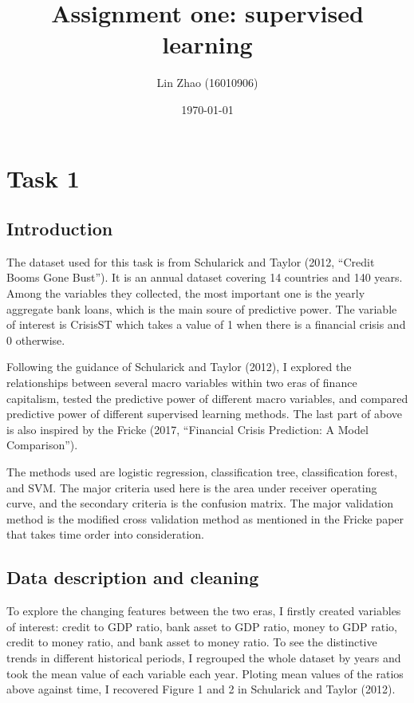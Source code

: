\documentclass{article}
\begin{document}
\title{Assignment one: supervised learning}
\author{Lin Zhao (16010906)}
\date{\today}
\maketitle

\newpage

\section*{Task 1}

\subsection*{Introduction}

The dataset used for this task is from Schularick and Taylor (2012,
``Credit Booms Gone Bust''). It is an annual dataset covering 14
countries and 140 years. Among the variables they collected, the most
important one is the yearly aggregate bank loans, which is 
the main soure of predictive power. The variable of interest is
CrisisST which takes a value of 1 when there is a financial crisis and 0
otherwise.

Following the guidance of Schularick and Taylor (2012), I explored the
relationships between several macro variables within two
eras of finance capitalism, tested the predictive power of different
macro variables, and compared predictive power of different supervised
learning methods. The last part of above is also inspired by the
Fricke (2017, ``Financial Crisis Prediction: A Model Comparison''). 

The methods used are logistic regression, classification
tree, classification forest, and SVM. The major criteria
used here is the area under receiver operating curve, and the secondary criteria
is the confusion matrix. The major validation method is the modified cross
validation method  as mentioned in the Fricke paper that takes time order into
consideration.

\subsection*{Data description and cleaning}

To explore the changing features between the two eras, I firstly created
variables of interest: credit to GDP ratio, bank asset to GDP ratio,
money to GDP ratio, credit to money ratio, and bank asset to money
ratio. To see the distinctive trends in different historical periods, I
regrouped the whole dataset by years and took the mean value of each variable
each year. Ploting mean values of the ratios above against time, I
recovered Figure 1 and 2 in Schularick and Taylor (2012).
\end{document}
